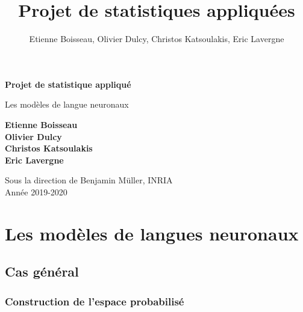 

\title{Projet de statistiques appliquées}
\author{Etienne Boisseau, Olivier Dulcy, Christos Katsoulakis, Eric Lavergne}
\date{}
\makeatletter

\pagestyle{theme}

\newcommand{\dm}{d_{model}}




\begin{titlepage}
   \begin{center}
       \vspace*{1cm}
 
       \Huge
       \textbf{Projet de statistique appliqué}
 
       \vspace{0.5cm}
       \LARGE
        Les modèles de langue neuronaux
 
       \vspace{1.5cm}
 
       \textbf{Etienne Boisseau} \\
       \textbf{Olivier Dulcy}\\
       \textbf{Christos Katsoulakis}\\
       \textbf{Eric Lavergne}
 
       \vfill
 
       \vspace{0.8cm}
       \Large
       Sous la direction de Benjamin Müller, INRIA \\
       \large
       Année 2019-2020
 
   \end{center}
\end{titlepage}

\tableofcontents

\section{Les modèles de langues neuronaux}

\subsection{Cas général}

\subsubsection{Construction de l'espace probabilisé}

